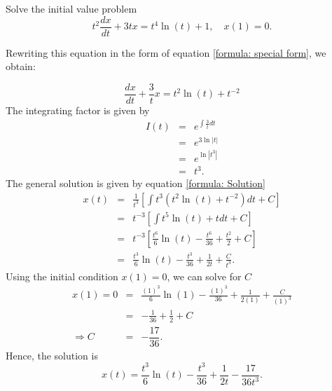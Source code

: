 \documentclass[11pt]{article}
\begin{document}
\begin{problem}
Solve the initial value problem
\begin{equation}
     t^2 \dfrac{ dx }{dt} + 3 t x = t^4 \ln(t) +1 , \quad x(1) =0 .
\end{equation}
\end{problem}
\begin{solution}
Rewriting this equation in the form of equation \eqref{formula: special form}, we obtain:

\begin{equation*}
\dfrac{ dx }{dt} + \frac{3}{t} x = t^2 \ln(t) + t^{-2}
\end{equation*}
The integrating factor is given by 
\begin{eqnarray*}
I(t) & = & e^{\int  \frac{3 }{t} dt} \\
& = & e^{3\ln|t|} \\
& = & e^{\ln|t^{3}|} \\
& = & t^{3} .
\end{eqnarray*}
The general solution is given by equation \eqref{formula: Solution}
\begin{eqnarray*}
x(t) & = & \frac{1}{t^{3}} \left[ \int t^{3}(t^2 \ln(t) + t^{-2}) dt + C \right]\\
& = & t^{-3} \left[ \int t^5 \ln(t) + t dt + C \right]\\
& = & t^{-3} \left[ \frac{t^6}{6} \ln(t) - \frac{t^6}{36} + \frac{t^2}{2} + C \right]\\
& = &  \frac{t^3}{6} \ln(t) - \frac{t^3}{36} + \frac{1}{2t} + \frac{C}{t^3}.
\end{eqnarray*}
Using the initial condition $x(1) =0$, we can solve for $C$
\begin{eqnarray*}
x(1) = 0 & = & \frac{(1)^3}{6} \ln(1) - \frac{(1)^3}{36} + \frac{1}{2(1)} + \frac{C}{(1)^3} \\
& = &  - \frac{1}{36} + \frac{1}{2} + C \\
 \Rightarrow C & = & -\dfrac{17}{36}.
\end{eqnarray*}
Hence, the solution is
\begin{equation*}
     \boxed{x(t) = \dfrac{t^3}{6} \ln(t) - \dfrac{t^3}{36} + \dfrac{1}{2t} - \dfrac{17}{36t^3} }.
\end{equation*}

\end{solution}
\end{document}
